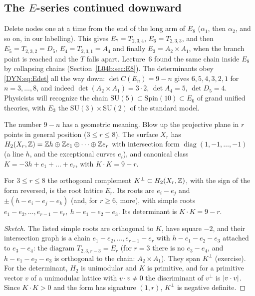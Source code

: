 \subsection*{The $E$-series continued downward}
Delete nodes one at a time from the end of the long arm of $E_8$ ($\alpha_1$, then $\alpha_2$, and so on, in
our labelling). This gives $E_7=T_{2,3,4}$, $E_6=T_{2,3,3}$, and then $E_5=T_{2,3,2}=D_5$, $E_4=T_{2,3,1}=A_4$ and finally
$E_3=A_2\times A_1$, when the branch point is reached and the $T$ falls apart. Lecture~6 found the same
chain inside $E_8$ by collapsing chains (Section~\ref{L04b:sec:E8}). The determinants obey
\eqref{DYN:eq:Edet} all the way down: $\det C(E_n)=9-n$ gives $6,5,4,3,2,1$ for $n=3,\dots,8$, and
indeed $\det(A_2\times A_1)=3\cdot2$, $\det A_4=5$, $\det D_5=4$. Physicists will recognize the chain
$\mathrm{SU}(5)\subset\mathrm{Spin}(10)\subset E_6$ of grand unified theories, with $E_3$ the
$\mathrm{SU}(3)\times\mathrm{SU}(2)$ of the standard model.

The number $9-n$ has a geometric meaning. Blow up the projective plane in $r$ points in general position
($3\le r\le8$). The surface $X_r$ has $H_2(X_r,\mathbb{Z})=\mathbb{Z} h\oplus\mathbb{Z} e_1\oplus\dots\oplus\mathbb{Z} e_r$ with intersection
form $\operatorname{diag}(1,-1,\dots,-1)$ (a line $h$, and the exceptional curves $e_i$), and canonical class
$K=-3h+e_1+\dots+e_r$, with $K\cdot K=9-r$.

\begin{proposition}\label{DYN:prop:delpezzo}
For $3\le r\le8$ the orthogonal complement $K^\perp\subset H_2(X_r,\mathbb{Z})$, with the sign of the form reversed,
is the root lattice $E_r$. Its roots are $e_i-e_j$ and $\pm(h-e_i-e_j-e_k)$ (and, for $r\ge6$, more), with
simple roots $e_1-e_2,\dots,e_{r-1}-e_r,\ h-e_1-e_2-e_3$. Its determinant is $K\cdot K=9-r$.
\end{proposition}

\begin{proof}[Sketch]
The listed simple roots are orthogonal to $K$, have square $-2$, and their intersection graph is a chain
$e_1-e_2,\dots,e_{r-1}-e_r$ with $h-e_1-e_2-e_3$ attached to $e_3-e_4$: the diagram $T_{2,3,r-3}=E_r$
(for $r=3$ there is no $e_3-e_4$, and $h-e_1-e_2-e_3$ is orthogonal to the chain: $A_2\times A_1$).
They span $K^\perp$ (exercise). For the determinant, $H_2$ is unimodular and $K$ is primitive, and for a
primitive vector $v$ of a unimodular lattice with $v\cdot v\ne0$ the discriminant of $v^\perp$ is
$\left\lvert v\cdot v \right\rvert$. Since $K\cdot K>0$ and the form has signature $(1,r)$, $K^\perp$ is negative definite.
\end{proof}

